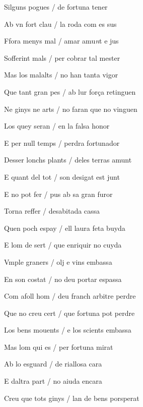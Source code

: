 \documentclass[12pt]{article}
\begin{document}
\begin{estrofa}

 Silguns pogues / de fortuna tener

 Ab vn fort clau / la roda com es sus

 Ffora menys mal / amar amu\textit{n}t e jus

 Sofferint mals / per cobrar tal mester

 Mas los malalts / no han tanta vigor

 Que tant gran pes / ab lur for\c{c}a retinguen

 Ne ginys ne arts / no faran que no vinguen

 Los quey seran / en la falsa honor

\end{estrofa}



\begin{estrofa}

 E per null temps / perdra fortunador

 Desser lonchs plants / deles terras amunt

 E quant del tot / son desigat est junt

 E no pot fer / pus ab sa gran furor

 Torna reffer / desabitada cassa

 Quen poch espay / ell laura feta buyda

 E lom de sert / que enriquir no cuyda

 Vmple graners / olj e vins embassa

\end{estrofa}



\begin{estrofa}

 En son costat / no deu portar espassa

 Com afoll hom / deu franch arbitre perdre

 Que no creu cert / que fortuna pot perdre

 Los bens mouents / e los scients embassa

 Mas lom qui es / per fortuna mirat

 Ab lo esguard / de riallosa cara

 E daltra part / no aiuda encara

 Creu que tots ginys / lan de bens porsperat

\end{estrofa}
\end{document}
